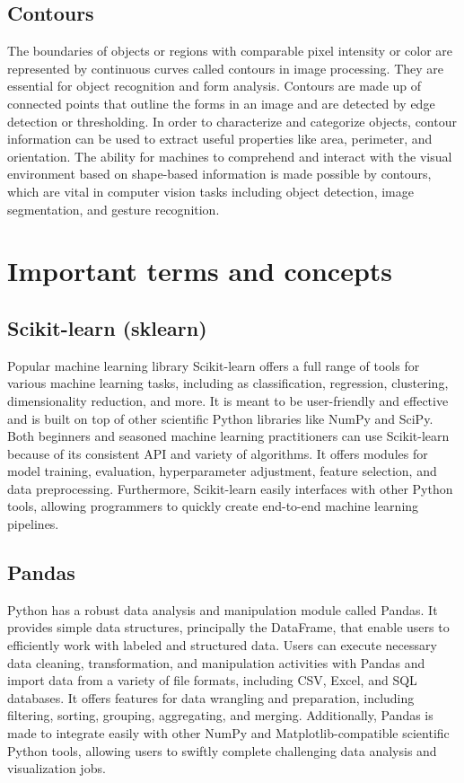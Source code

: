 \documentclass[a4paper,11pt]{report}%
\renewcommand{\\}{\vspace*{0.5\baselineskip} \newline}
\begin{document}
\subsection{Contours}
The boundaries of objects or regions with comparable pixel intensity or color are represented by continuous curves called contours in image processing. They are essential for object recognition and form analysis. Contours are made up of connected points that outline the forms in an image and are detected by edge detection or thresholding. In order to characterize and categorize objects, contour information can be used to extract useful properties like area, perimeter, and orientation. The ability for machines to comprehend and interact with the visual environment based on shape-based information is made possible by contours, which are vital in computer vision tasks including object detection, image segmentation, and gesture recognition.



\section{Important terms and concepts}
\subsection{Scikit-learn (sklearn)}
Popular machine learning library Scikit-learn offers a full range of tools for various machine learning tasks, including as classification, regression, clustering, dimensionality reduction, and more. It is meant to be user-friendly and effective and is built on top of other scientific Python libraries like NumPy and SciPy. Both beginners and seasoned machine learning practitioners can use Scikit-learn because of its consistent API and variety of algorithms. It offers modules for model training, evaluation, hyperparameter adjustment, feature selection, and data preprocessing. Furthermore, Scikit-learn easily interfaces with other Python tools, allowing programmers to quickly create end-to-end machine learning pipelines.

\subsection{Pandas}
Python has a robust data analysis and manipulation module called Pandas. It provides simple data structures, principally the DataFrame, that enable users to efficiently work with labeled and structured data. Users can execute necessary data cleaning, transformation, and manipulation activities with Pandas and import data from a variety of file formats, including CSV, Excel, and SQL databases. It offers features for data wrangling and preparation, including filtering, sorting, grouping, aggregating, and merging. Additionally, Pandas is made to integrate easily with other NumPy and Matplotlib-compatible scientific Python tools, allowing users to swiftly complete challenging data analysis and visualization jobs.
\end{document}
